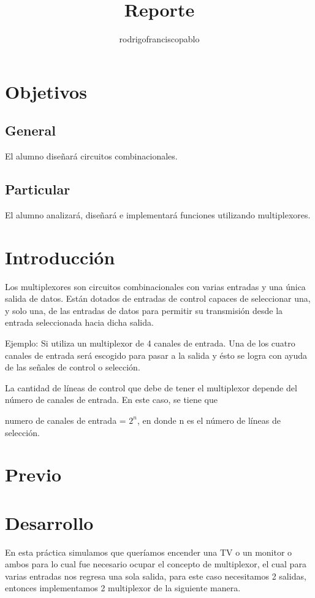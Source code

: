 \documentclass{mylib/reporteConCalif}
\title{Reporte}
\author{rodrigofranciscopablo }
\begin{document}
\coverPage

\section{Objetivos}

\subsection{General}

El alumno diseñará circuitos combinacionales.

\subsection{Particular}

El alumno analizará, diseñará e implementará funciones utilizando multiplexores.

\section{Introducción}

Los multiplexores son circuitos combinacionales con varias entradas y una única salida de datos. Están dotados de entradas de control capaces de seleccionar una, y solo una, de las entradas de datos para permitir su transmisión desde la entrada seleccionada hacia dicha salida.

Ejemplo: Si utiliza un multiplexor de 4 canales de entrada. Una de los cuatro canales de entrada será escogido para pasar a la salida y ésto se logra con ayuda de las señales de control o selección.

La cantidad de líneas de control que debe de tener el multiplexor depende del número de canales de entrada. En este caso, se tiene que

numero de canales de entrada = $2^n$, en donde n es el número de líneas de selección.


\newpage
\section{Previo}

\newpage
\section{Desarrollo}

En esta práctica simulamos que queríamos encender una TV o un monitor o ambos para lo cual fue necesario ocupar el concepto de multiplexor, el cual para varias entradas nos regresa una sola salida, para este caso necesitamos 2 salidas, entonces implementamos 2 multiplexor de la siguiente manera.
\end{document}
